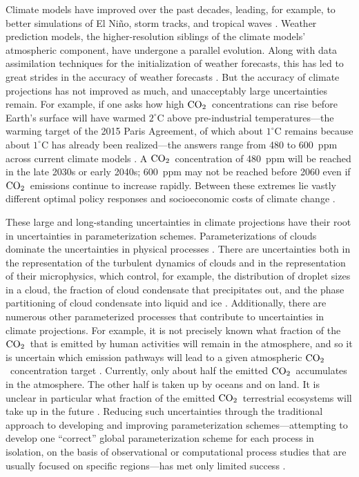 \documentclass[draft]{agujournal}
\newcommand{\coo}{${\rm {CO}_{2}}$}
\begin{document}
Climate models have improved over the past decades, leading, for example, to better simulations of El Ni{\~n}o, storm tracks, and tropical waves \citep{Guilyardi09a,Hung13a,Flato13a}. Weather prediction models, the higher-resolution siblings of the climate models' atmospheric component, have undergone a parallel evolution. Along with data assimilation techniques for the initialization of weather forecasts, this has led to great strides in the accuracy of weather forecasts \citep{Bauer15a}. But the accuracy of climate projections has not improved as much, and unacceptably large uncertainties remain.  For example, if one asks how high \coo\ concentrations can rise before Earth's surface will have warmed $2^\circ\mathrm{C}$ above pre-industrial temperatures---the warming target of the 2015 Paris Agreement, of which about $1^\circ\mathrm{C}$ remains because about $1^\circ\mathrm{C}$ has already been realized---the answers range from 480 to 600~ppm across current climate models \citep{Schneider17a}. A \coo\ concentration of 480~ppm will be reached in the late 2030s or early 2040s; 600~ppm may not be reached before 2060 even if \coo\ emissions continue to increase rapidly. Between these extremes lie vastly different optimal policy responses and socioeconomic costs of climate change \citep{Hope15a}.

These large and long-standing uncertainties in climate projections have their root in uncertainties in parameterization schemes. Parameterizations of clouds dominate the uncertainties in physical processes \citep{Cess89a,Cess90a,Stephens05,Bony06,Soden06a,Vial13a,Webb13b,Brient16b}. There are uncertainties both in the representation of the turbulent dynamics of clouds and in the representation of their microphysics, which control, for example, the distribution of droplet sizes in a cloud, the fraction of cloud condensate that precipitates out, and the phase partitioning of cloud condensate into liquid and ice \citep[e.g.,][]{Stainforth05a,Jiang12a,Suzuki13a,Golaz13a,Bodas-Salcedo14a,Zhao16a,Kay16a}. Additionally, there are numerous other parameterized processes that contribute to uncertainties in climate projections. For example, it is not precisely known what fraction of the \coo\ that is emitted by human activities will remain in the atmosphere, and so it is uncertain which emission pathways will lead to a given atmospheric \coo\ concentration target \citep{Knutti08b,Meinshausen09a,Friedlingstein15a}. Currently, only about half the emitted \coo\ accumulates in the atmosphere. The other half is taken up by oceans and on land. It is unclear in particular what fraction of the emitted \coo\ terrestrial ecosystems will take up in the future \citep{Friedlingstein06a,Canadell07a,Knorr09a,Le-Quere13a,Todd-Brown13a,Friedlingstein14a,Friend14a}. Reducing such uncertainties through the traditional approach to developing and improving parameterization schemes---attempting to develop one ``correct'' global parameterization scheme for each process in isolation, on the basis of observational or computational process studies that are usually focused on specific regions---has met only limited success \citep{Jakob03a,Jakob10a,Randall13b}.
\end{document}
